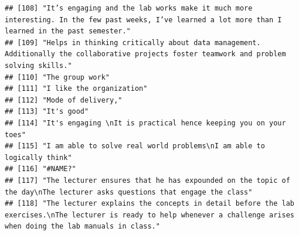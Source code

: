 \documentclass[
]{article}
\begin{document}
\begin{verbatim}
## [108] "It’s engaging and the lab works make it much more interesting. In the few past weeks, I’ve learned a lot more than I learned in the past semester."                                                                                               
## [109] "Helps in thinking critically about data management. Additionally the collaborative projects foster teamwork and problem solving skills."                                                                                                          
## [110] "The group work"                                                                                                                                                                                                                                   
## [111] "I like the organization"                                                                                                                                                                                                                          
## [112] "Mode of delivery,"                                                                                                                                                                                                                                
## [113] "It's good"                                                                                                                                                                                                                                        
## [114] "It's engaging \nIt is practical hence keeping you on your toes"                                                                                                                                                                                   
## [115] "I am able to solve real world problems\nI am able to logically think"                                                                                                                                                                             
## [116] "#NAME?"                                                                                                                                                                                                                                           
## [117] "The lecturer ensures that he has expounded on the topic of the day\nThe lecturer asks questions that engage the class"                                                                                                                            
## [118] "The lecturer explains the concepts in detail before the lab exercises.\nThe lecturer is ready to help whenever a challenge arises when doing the lab manuals in class."                                                                           

\end{verbatim}
\end{document}
